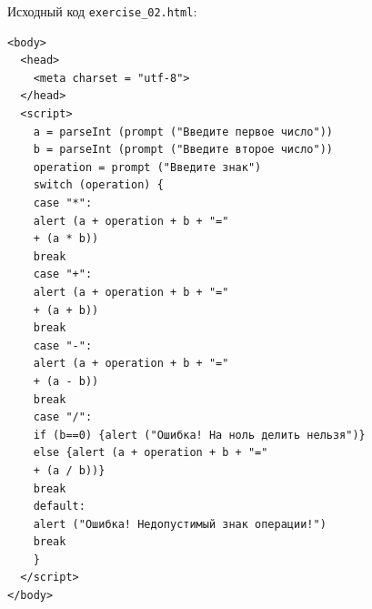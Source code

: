 Исходный код \verb|exercise_02.html|:
\begin{verbatim}
<body>
  <head>
    <meta charset = "utf-8">
  </head>
  <script>
    a = parseInt (prompt ("Введите первое число"))
    b = parseInt (prompt ("Введите второе число"))
    operation = prompt ("Введите знак")
    switch (operation) {
    case "*":
    alert (a + operation + b + "="
    + (a * b))
    break
    case "+":
    alert (a + operation + b + "="
    + (a + b))
    break
    case "-":
    alert (a + operation + b + "="
    + (a - b))
    break
    case "/":
    if (b==0) {alert ("Ошибка! На ноль делить нельзя")}
    else {alert (a + operation + b + "="
    + (a / b))}
    break
    default:
    alert ("Ошибка! Недопустимый знак операции!")
    break
    }
  </script>
</body>
\end{verbatim}
